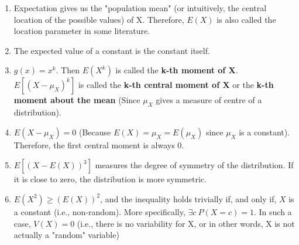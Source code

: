 \begin{note}
\end{note}
\begin{enumerate}
    \item Expectation gives us the "population mean" (or intuitively, the central location of the possible values) of X. Therefore, $E(X)$ is also called the location parameter in some literature.
    
    \item The expected value of a constant is the constant itself.
    
    \item $g(x) = x^k$. Then $E(X^k)$ is called the \textbf{k-th moment of X}. $E[(X-\mu_X)^k]$ is called the \textbf{k-th central moment of X} or the \textbf{k-th moment about the mean} (Since $\mu_X$ gives a measure of centre of a distribution).
    
    \item $E(X - \mu_X) = 0$ (Because $E(X) = \mu_X = E(\mu_X)$ since $\mu_X$ is a constant). Therefore, the first central moment is always 0.
    
    \item $E[(X - E(X))^3]$ measures the degree of symmetry of the distribution. If it is close to zero, the distribution is more symmetric.
    
    \item $E(X^2) \geq (E(X))^2$, and the inequality holds trivially if, and only if, $X$ is a constant (i.e., non-random). More specifically, $\exists c \  P(X = c) = 1$. In such a case, $V(X) = 0$ (i.e., there is no variability for X, or in other words, X is not actually a "random" variable)
    

\end{enumerate}
